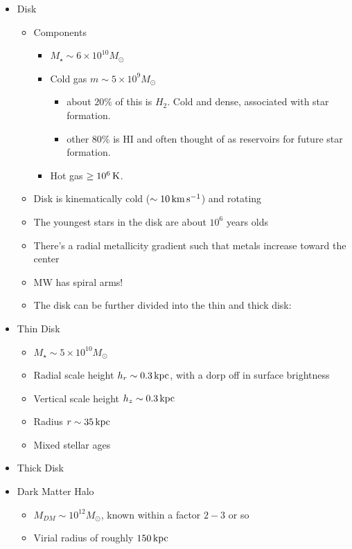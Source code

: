 \documentclass{article}
\newcommand{\unit}[1]{{\,\rm #1}}
\newcommand{\s}{\unit{s}}
\newcommand{\km}{\unit{km}}
\def\mstar{M_\star}
\def\msun{M_\odot}
\def\e#1{\times 10^{ #1}}
\newcommand{\K}{\unit{K}}
\newcommand{\kpc}{\unit{kpc}}
\begin{document}
\begin{itemize}
    \item Disk
    \begin{itemize}
    \item Components
        \begin{itemize}
        \item $M_\star \sim 6\e{10} \msun$
        \item Cold gas $m\sim 5\e{9} \msun$
            \begin{itemize}
                \item about $20\%$ of this is $H_2$. Cold and dense, associated with star formation. 
                \item other $80\%$ is HI and often thought of as reservoirs for future star formation.
            \end{itemize}
            \item Hot gas $\geq 10^{6}\K$.
        \end{itemize}
        \item Disk is kinematically cold ($\sim 10 \km \s^{-1}$) and rotating
        \item The youngest stars in the disk are about $10^6$ years olds
        \item There's a radial metallicity gradient such that metals increase toward the center
        \item MW has spiral arms! 
        \item The disk can be further divided into the thin and thick disk:
    \end{itemize}
    \item Thin Disk
    \begin{itemize}
        \item $\mstar \sim 5\e{10} \msun$
        \item Radial scale height $h_r \sim 0.3 \kpc$, with a dorp off in surface brightness
        \item Vertical scale height $h_z \sim 0.3 \kpc$
        \item Radius $r \sim 35 \kpc$
        \item Mixed stellar ages
    \end{itemize}
    \item Thick Disk
    \item Dark Matter Halo
    \begin{itemize}
        \item $M_{DM} \sim 10^{12} \msun$, known within a factor $2-3$ or so
        \item Virial radius of roughly $150\kpc$

\end{itemize}
\end{itemize}
\end{document}
